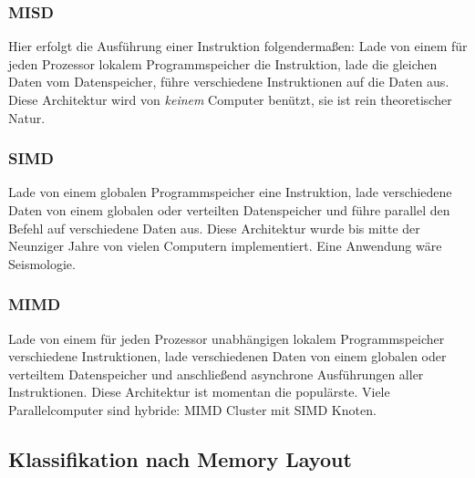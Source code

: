 \subsubsection{MISD}
Hier erfolgt die Ausführung einer Instruktion folgendermaßen: Lade von einem
für jeden Prozessor lokalem Programmspeicher die Instruktion, lade die gleichen
Daten vom Datenspeicher, führe verschiedene Instruktionen auf die Daten aus.
Diese Architektur wird von \textit{keinem} Computer benützt, sie ist rein theoretischer
Natur.

\subsubsection{SIMD}
Lade von einem globalen Programmspeicher eine Instruktion, lade verschiedene Daten
von einem globalen oder verteilten Datenspeicher und führe parallel den Befehl
auf verschiedene Daten aus. Diese Architektur wurde bis mitte der Neunziger Jahre
von vielen Computern implementiert. Eine Anwendung wäre Seismologie.

\subsubsection{MIMD}
Lade von einem für jeden Prozessor unabhängigen lokalem Programmspeicher verschiedene
Instruktionen, lade verschiedenen Daten von einem globalen oder verteiltem
Datenspeicher und anschließend asynchrone Ausführungen aller Instruktionen.
Diese Architektur ist momentan die populärste. Viele Parallelcomputer sind
hybride: MIMD Cluster mit SIMD Knoten.

\subsection{Klassifikation nach Memory Layout}
